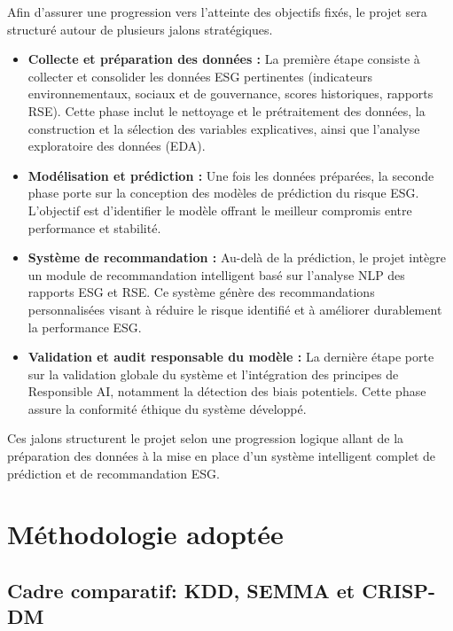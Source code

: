 Afin d’assurer une progression vers l’atteinte des objectifs fixés, le projet sera structuré autour de plusieurs jalons stratégiques.

\begin{itemize}
    \item \textbf{Collecte et préparation des données :} La première étape consiste à collecter et consolider les données ESG pertinentes (indicateurs environnementaux, sociaux et de gouvernance, scores historiques, rapports RSE). Cette phase inclut le nettoyage et le prétraitement des données, la construction et la sélection des variables explicatives, ainsi que l’analyse exploratoire des données (EDA).
    
    \item \textbf{Modélisation et prédiction :} Une fois les données préparées, la seconde phase porte sur la conception des modèles de prédiction du risque ESG. L’objectif est d’identifier le modèle offrant le meilleur compromis entre performance et stabilité.
    
    \item \textbf{Système de recommandation :} Au-delà de la prédiction, le projet intègre un module de recommandation intelligent basé sur l’analyse NLP des rapports ESG et RSE. Ce système génère des recommandations personnalisées visant à réduire le risque identifié et à améliorer durablement la performance ESG.
    
    \item \textbf{Validation et audit responsable du modèle :} La dernière étape porte sur la validation globale du système et l’intégration des principes de Responsible AI, notamment la détection des biais potentiels. Cette phase assure la conformité éthique du système développé.
\end{itemize}

Ces jalons structurent le projet selon une progression logique allant de la préparation des données à la mise en place d’un système intelligent complet de prédiction et de recommandation ESG.

\section{Méthodologie adoptée}

\subsection{Cadre comparatif: KDD, SEMMA et CRISP-DM}

